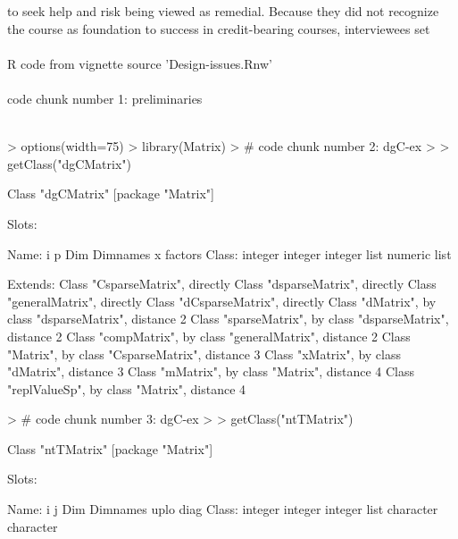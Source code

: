 \documentclass{article}
\begin{document}
 to seek help and risk being viewed as remedial. Because they did not recognize
 the course as foundation to success in credit-bearing courses, interviewees set
\textit{\\\\}
 R code from vignette source 'Design-issues.Rnw'
\textit{\\\\}
 code chunk number 1: preliminaries
\textit{\\\\}
\begin{Schunk}
\begin{Sinput}
> options(width=75)
> library(Matrix)
> # code chunk number 2: dgC-ex
> 
> getClass("dgCMatrix")
\end{Sinput}
\begin{Soutput}
Class "dgCMatrix" [package "Matrix"]

Slots:
                                                            
Name:         i        p      Dim Dimnames        x  factors
Class:  integer  integer  integer     list  numeric     list

Extends: 
Class "CsparseMatrix", directly
Class "dsparseMatrix", directly
Class "generalMatrix", directly
Class "dCsparseMatrix", directly
Class "dMatrix", by class "dsparseMatrix", distance 2
Class "sparseMatrix", by class "dsparseMatrix", distance 2
Class "compMatrix", by class "generalMatrix", distance 2
Class "Matrix", by class "CsparseMatrix", distance 3
Class "xMatrix", by class "dMatrix", distance 3
Class "mMatrix", by class "Matrix", distance 4
Class "replValueSp", by class "Matrix", distance 4
\end{Soutput}
\begin{Sinput}
> # code chunk number 3: dgC-ex
> 
> getClass("ntTMatrix")
\end{Sinput}
\begin{Soutput}
Class "ntTMatrix" [package "Matrix"]

Slots:
                                                                  
Name:          i         j       Dim  Dimnames      uplo      diag
Class:   integer   integer   integer      list character character


\end{Soutput}
\end{Schunk}
\end{document}
